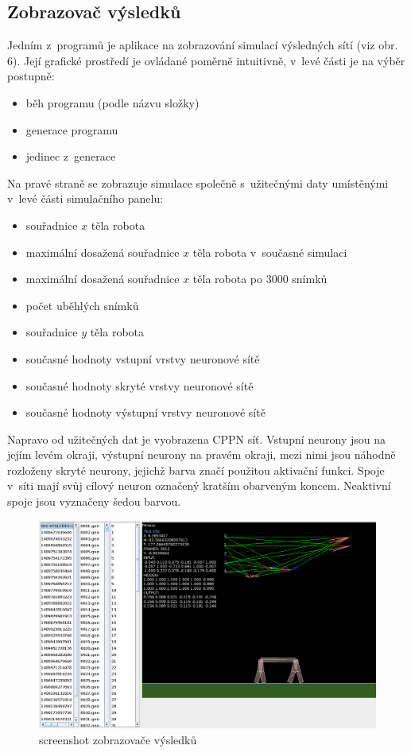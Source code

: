 \documentclass[a4]{article}
\begin{document}
\subsection{Zobrazovač výsledků}
Jedním z~programů je aplikace na zobrazování simulací výsledných sítí (viz obr. 6). Její grafické prostředí je ovládané poměrně intuitivně, v~levé části je na výběr postupně:
\begin{itemize}
\item{běh programu (podle názvu složky)}
\item{generace programu}
\item{jedinec z~generace}
\end{itemize}
Na pravé straně se zobrazuje simulace společně s~užitečnými daty umístěnými v~levé části simulačního panelu:
\begin{itemize}
\item{souřadnice $x$ těla robota}
\item{maximální dosažená souřadnice $x$ těla robota v~současné simulaci}
\item{maximální dosažená souřadnice $x$ těla robota po 3000 snímků}
\item{počet uběhlých snímků}
\item{souřadnice $y$ těla robota}
\item{současné hodnoty vstupní vrstvy neuronové sítě}
\item{současné hodnoty skryté vrstvy neuronové sítě}
\item{současné hodnoty výstupní vrstvy neuronové sítě}
\end{itemize}
Napravo od užitečných dat je vyobrazena CPPN síť. Vstupní neurony jsou na jejím levém okraji, výstupní neurony na pravém okraji, mezi nimi jsou náhodně rozloženy skryté neurony, jejichž barva značí použitou aktivační funkci. Spoje v~síti mají svůj cílový neuron označený kratším obarveným koncem. Neaktivní spoje jsou vyznačeny šedou barvou.
\begin{figure}
\includegraphics[width=1\linewidth]{program}
\caption{screenshot zobrazovače výsledků}
\end{figure}
\end{document}
